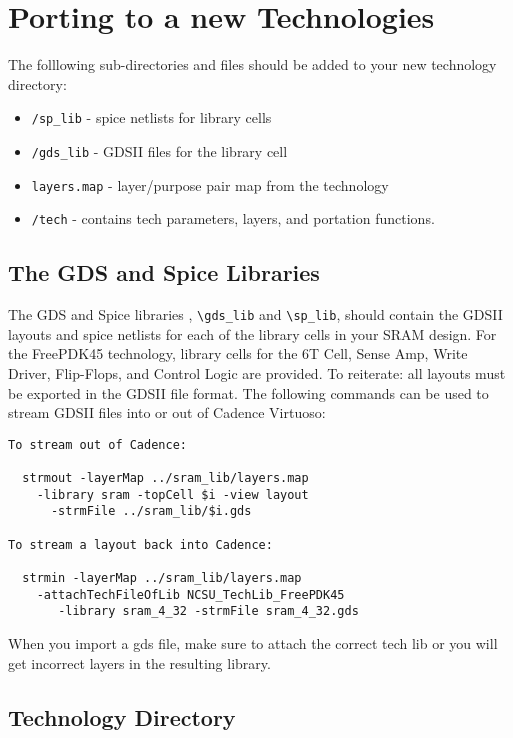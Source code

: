 \section{Porting to a new Technologies}
\label{sec:porting}

The folllowing sub-directories and files should be added to your new technology directory:
\begin{itemize}
\item \verb|/sp_lib| - spice netlists for library cells
\item \verb|/gds_lib| - GDSII files for the library cell
\item \verb|layers.map| - layer/purpose pair map from the technology
\item \verb|/tech| - contains tech parameters, layers, and portation functions.
\end{itemize}

\subsection{The GDS and Spice Libraries}

The GDS and Spice libraries , \verb|\gds_lib| and \verb|\sp_lib|, should contain the GDSII layouts and spice netlists for each of the library cells in your SRAM design.  For the FreePDK45 technology, library cells for the 6T Cell, Sense Amp, Write Driver, Flip-Flops, and Control Logic are provided.  To reiterate: all layouts must be exported in the GDSII file format.  The following commands can be used to stream GDSII files into or out of Cadence Virtuoso:
\begin{verbatim}
To stream out of Cadence:

  strmout -layerMap ../sram_lib/layers.map 
    -library sram -topCell $i -view layout 
      -strmFile ../sram_lib/$i.gds

To stream a layout back into Cadence:

  strmin -layerMap ../sram_lib/layers.map 
    -attachTechFileOfLib NCSU_TechLib_FreePDK45 
       -library sram_4_32 -strmFile sram_4_32.gds
\end{verbatim}
When you import a gds file, make sure to attach the correct tech lib or you will get incorrect layers in the resulting library.



\subsection{Technology Directory}
\label{sec:tech}

